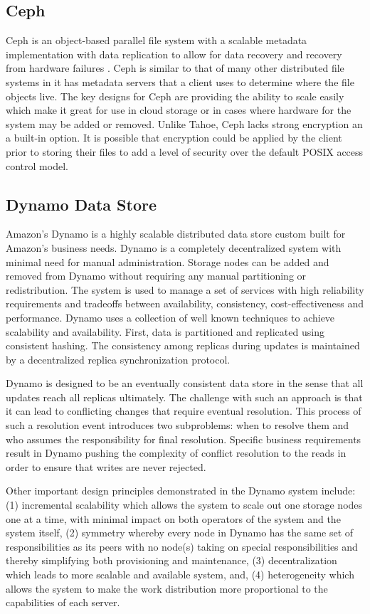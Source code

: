 \documentclass[11pt]{article}
\begin{document}
\subsection{Ceph}
Ceph is an object-based parallel file system with a scalable metadata
implementation with data replication to allow for data recovery and
recovery from hardware failures
\cite{Weil:2012p1035,Weil:2012p1010,Weil:2006p1273}.
Ceph is similar to that of many other
distributed file systems in it has metadata servers that a client uses
to determine where the file objects live. The key designs for Ceph are
providing the ability to scale easily which make it great for use in
cloud storage or in cases where hardware for the system may be added
or removed. Unlike Tahoe, Ceph lacks strong encryption an a built-in
option. It is
possible that encryption could be applied by the client prior to
storing their files to add a level of security over the default POSIX
access control model.

\subsection{Dynamo Data Store}
Amazon's Dynamo is a highly scalable distributed data store custom
built for Amazon’s business needs. Dynamo is a completely
decentralized system with minimal need for manual
administration. Storage nodes can be added and removed from Dynamo
without requiring any manual partitioning or redistribution. The
system is used to manage a set of services with high reliability
requirements and tradeoffs between availability, consistency,
cost-effectiveness and performance. Dynamo uses a collection of well
known techniques to achieve scalability and availability. First, data
is partitioned and replicated using consistent hashing. The
consistency among replicas during updates is maintained by a
decentralized replica synchronization protocol.

Dynamo is designed to be an eventually consistent data store in the
sense that all updates reach all replicas ultimately. The challenge
with such an approach is that it can lead to conflicting changes that
require eventual resolution. This process of such a resolution event
introduces two subproblems: when to resolve them and who assumes the
responsibility for final resolution. Specific business requirements
result in Dynamo pushing the complexity of conflict resolution to the
reads in order to ensure that writes are never rejected.

Other important design principles demonstrated in the Dynamo system
include: (1) incremental scalability which allows the system to scale
out one storage nodes one at a time, with minimal impact on both
operators of the system and the system itself, (2) symmetry whereby
every node in Dynamo has the same set of responsibilities as its peers
with no node(s) taking on special responsibilities and thereby
simplifying both provisioning and maintenance, (3) decentralization
which leads to more scalable and available system, and, (4)
heterogeneity which allows the system to make the work distribution
more proportional to the capabilities of each server.
\end{document}
